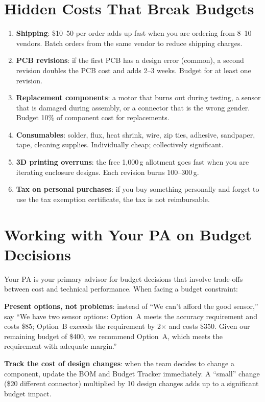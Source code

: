 \section{Hidden Costs That Break Budgets}
\begin{enumerate}[nosep,leftmargin=1.5em]
\item \textbf{Shipping}: \$10--50 per order adds up fast when you are ordering from 8--10 vendors. Batch orders from the same vendor to reduce shipping charges.
\item \textbf{PCB revisions}: if the first PCB has a design error (common), a second revision doubles the PCB cost and adds 2--3 weeks. Budget for at least one revision.
\item \textbf{Replacement components}: a motor that burns out during testing, a sensor that is damaged during assembly, or a connector that is the wrong gender. Budget 10\% of component cost for replacements.
\item \textbf{Consumables}: solder, flux, heat shrink, wire, zip ties, adhesive, sandpaper, tape, cleaning supplies. Individually cheap; collectively significant.
\item \textbf{3D printing overruns}: the free 1,000\,g allotment goes fast when you are iterating enclosure designs. Each revision burns 100--300\,g.
\item \textbf{Tax on personal purchases}: if you buy something personally and forget to use the tax exemption certificate, the tax is not reimbursable.
\end{enumerate}



\section{Working with Your PA on Budget Decisions}
Your PA is your primary advisor for budget decisions that involve trade-offs between cost and technical performance. When facing a budget constraint:

\textbf{Present options, not problems}: instead of ``We can't afford the good sensor,'' say ``We have two sensor options: Option~A meets the accuracy requirement and costs \$85; Option~B exceeds the requirement by 2$\times$ and costs \$350. Given our remaining budget of \$400, we recommend Option~A, which meets the requirement with adequate margin.''

\textbf{Track the cost of design changes}: when the team decides to change a component, update the BOM and Budget Tracker immediately. A ``small'' change (\$20 different connector) multiplied by 10 design changes adds up to a significant budget impact.

